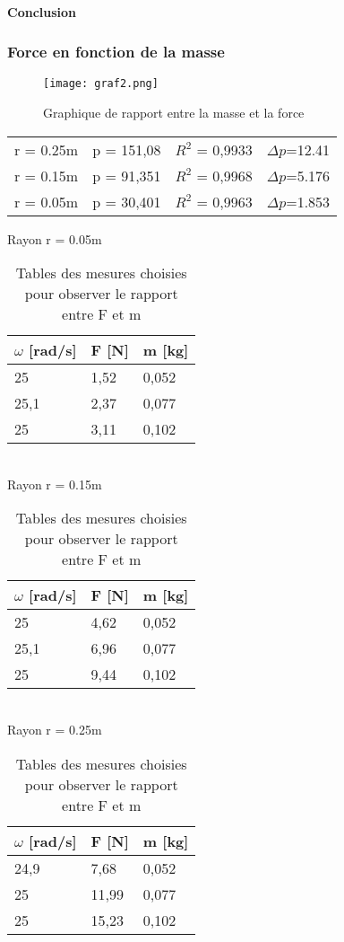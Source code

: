 \paragraph{Conclusion}

\newpage
\subsubsection{Force en fonction de la masse}

\begin{figure}[!h]
    \caption[Graphique masse force]{Graphique de rapport entre la masse et la force}
    \centering
    \texttt{[image: graf2.png]}
\end{figure}

\begin{table}[ht]
    \centering
    \begin{tabular}{l l l l}
    r = 0.25m & p = 151,08& $R^2$ = 0,9933 & $\Delta p$=12.41\\
    r = 0.15m & p = 91,351& $R^2$ = 0,9968 & $\Delta p$=5.176\\
    r = 0.05m & p = 30,401& $R^2$ = 0,9963 & $\Delta p$=1.853\\
    \end{tabular}
\end{table}


\begin{table}[ht]
    \centering
    \caption[Tables mesures masse force]{Tables des mesures choisies pour observer le rapport entre F et m}

    Rayon r = 0.05m\\[1px]
    \begin{tabular}{|l|l|l|}
    \hline
	$\omega$ [rad/s] &F [N]	&m [kg]	\\
    \hline
	25	&1,52	&0,052 \\
	25,1	&2,37	&0,077 \\
	25	&3,11	&0,102 \\
    \hline
    \end{tabular}\\[5px]

    Rayon r = 0.15m\\[1px]
    \begin{tabular}{|l|l|l|}
    \hline
	$\omega$ [rad/s] &F [N]	&m [kg]	\\
    \hline
	25	&4,62	&0,052 \\
	25,1	&6,96	&0,077 \\
	25	&9,44	&0,102 \\
    \hline
    \end{tabular}\\[5px]

    Rayon r = 0.25m\\[1px]
    \begin{tabular}{|l|l|l|}
    \hline
	$\omega$ [rad/s] &F [N]	&m [kg]	\\
    \hline
	24,9	&7,68	&0,052 \\
	25	&11,99	&0,077 \\
	25	&15,23	&0,102 \\
    \hline
    \end{tabular}
\end{table}

